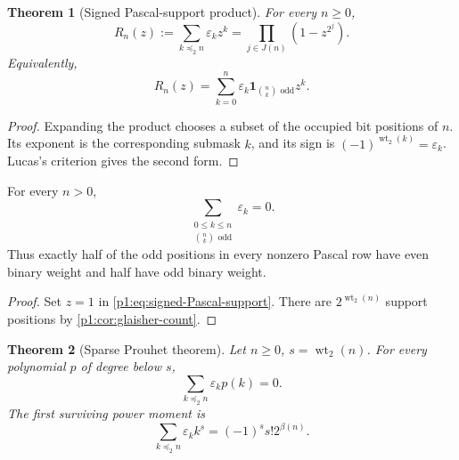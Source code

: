 \documentclass[11pt,oneside]{article}
\numberwithin{equation}{section}
\newtheorem{theorem}{Theorem}[section]
\theoremstyle{definition}
\theoremstyle{remark}
\newcommand{\wt}{\operatorname{wt}_2}
\newcommand{\eps}{\varepsilon}
\newcommand{\submask}{\mathrel{\preccurlyeq_2}}
\newcommand{\ind}{\mathbf 1}
\begin{document}
\begin{theorem}[Signed Pascal-support product]
\label{p1:thm:signed-Pascal-support}
For every \(n\ge0\),
\begin{equation}
  \boxed{
  R_n(z):=\sum_{k\submask n}\eps_kz^k
  =\prod_{j\in J(n)}(1-z^{2^j}).}
  \label{p1:eq:signed-Pascal-support}
\end{equation}
Equivalently,
\begin{equation}
  R_n(z)=\sum_{k=0}^{n}
  \eps_k\ind_{\binom nk\text{ odd}}z^k.
  \label{p1:eq:signed-Pascal-Lucas}
\end{equation}
\end{theorem}

\begin{proof}
Expanding the product chooses a subset of the occupied bit positions of
\(n\).  Its exponent is the corresponding submask \(k\), and its sign is
\((-1)^{\wt(k)}=\eps_k\).  Lucas's criterion gives the second form.
\end{proof}

\begin{corollary}
\label{p1:cor:Pascal-support-balance}
For every \(n>0\),
\begin{equation}
  \sum_{\substack{0\le k\le n\\\binom nk\text{ odd}}}\eps_k=0.
  \label{p1:eq:Pascal-support-balance}
\end{equation}
Thus exactly half of the odd positions in every nonzero Pascal row have even
binary weight and half have odd binary weight.
\end{corollary}

\begin{proof}
Set \(z=1\) in \eqref{p1:eq:signed-Pascal-support}.  There are
\(2^{\wt(n)}\) support positions by \cref{p1:cor:glaisher-count}.
\end{proof}

\begin{theorem}[Sparse Prouhet theorem]
\label{p1:thm:sparse-Prouhet}
Let \(n\ge0\), \(s=\wt(n)\).  For every polynomial \(p\) of degree below
\(s\),
\begin{equation}
  \boxed{
  \sum_{k\submask n}\eps_kp(k)=0.}
  \label{p1:eq:sparse-Prouhet}
\end{equation}
The first surviving power moment is
\begin{equation}
  \boxed{
  \sum_{k\submask n}\eps_kk^s
   =(-1)^ss!2^{\beta(n)}.}
  \label{p1:eq:sparse-first-moment}
\end{equation}
\end{theorem}
\end{document}
